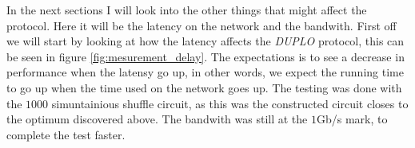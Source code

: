 \documentclass[twoside,11pt,openright]{report}
\newcommand{\DUPLO}{\textit{DUPLO} }
\begin{document}
\bigskip

In the next sections I will look into the other things that might affect the protocol. Here it will be the latency on the network and the bandwith. First off we will start by looking at how the latency affects the \DUPLO protocol, this can be seen in figure \ref{fig:mesurement_delay}. The expectations is to see a decrease in performance when the latensy go up, in other words, we expect the running time to go up when the time used on the network goes up. The testing was done with the $1000$ simuntainious shuffle circuit, as this was the constructed circuit closes to the optimum discovered above. The bandwith was still at the $1$Gb/s mark, to complete the test faster.

\bigskip

\begin{figure}
    \centering

    \begin{subfigure}{\textwidth}
        \centering
        \caption{}
        \label{fig:const_delay_plot}
    \end{subfigure}

    \vspace*{0cm}

    \begin{subfigure}{\textwidth}
        \centering
        \caption{}
        \label{fig:eval_delay_plot}
    \end{subfigure}


\end{figure}
\end{document}
